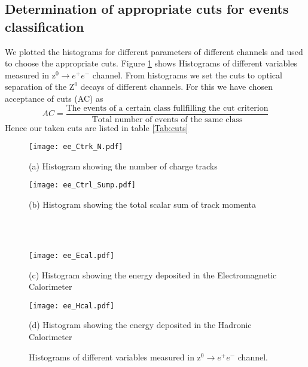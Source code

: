 \subsection{Determination of appropriate cuts for events classification}
We plotted the histograms for different parameters of different channels and used to choose the appropriate cuts. Figure \ref{Fig:histograms} shows Histograms of different variables measured in $  \text{z}^0\rightarrow e^+e^- $ channel. From histograms we set the cuts to optical separation of the $ \text{Z}^0 $ decays of different channels. For this we have chosen acceptance of cuts (AC) as
\begin{equation}
AC= \frac{\text{The events of a certain class fullfilling the cut criterion}}{\text{Total number of events of the same class}}
\end{equation}
Hence our taken cuts are listed in table \ref{Tab:cuts}

  
\begin{figure}[H]   
	\begin{minipage}[t]{0.6\textwidth}
		\texttt{[image: ee\_Ctrk\_N.pdf]}
		\begin{center}
			{(a) Histogram showing the number of charge tracks}
		\end{center}
	\end{minipage} \quad
	\begin{minipage}[t]{0.6\textwidth}
		\texttt{[image: ee\_Ctrl\_Sump.pdf]}
		\begin{center}
			{(b) Histogram showing the total scalar sum of track momenta}
		\end{center}
	\end{minipage}\\\\
	
	
	\begin{minipage}[t]{0.6\textwidth}
		\texttt{[image: ee\_Ecal.pdf]}
		\begin{center}
			{(c) Histogram showing the energy deposited in the Electromagnetic Calorimeter}
		\end{center}
	\end{minipage} \quad
	\begin{minipage}[t]{0.6\textwidth}
		\texttt{[image: ee\_Hcal.pdf]}
		\begin{center}
			{(d) Histogram showing the energy deposited in the Hadronic Calorimeter}
		\end{center}
	\end{minipage}
	\caption{Histograms of different variables measured in $  \text{z}^0\rightarrow e^+e^- $ channel.}
\label{Fig:histograms}	
\end{figure}

